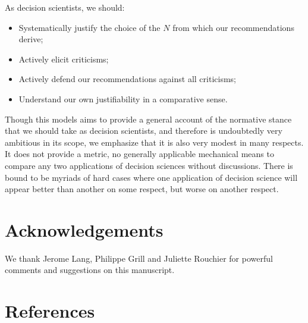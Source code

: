 \documentclass[preprint, french, english, 11pt, authoryear]{elsarticle}%
\begin{document}
As decision scientists, we should:
\begin{itemize}
	\item Systematically justify the choice of the $N$ from which our recommendations derive;
	\item Actively elicit criticisms;
	\item Actively defend our recommendations against all criticisms;
	\item Understand our own justifiability in a comparative sense.
\end{itemize}

Though this models aims to provide a general account of the normative stance that we should take as decision scientists, and therefore is undoubtedly very ambitious in its scope, we emphasize that it is also very modest in many respects. It does not provide a metric, no generally applicable mechanical means to compare any two applications of decision sciences without discussions. There is bound to be myriads of hard cases where one application of decision science will appear better than another on some respect, but worse on another respect.

\section*{Acknowledgements}
We thank Jerome Lang, Philippe Grill and Juliette Rouchier for powerful comments and suggestions on this manuscript.

\section*{References}



\renewcommand*{\appendixname}{}
\appendix
\end{document}
